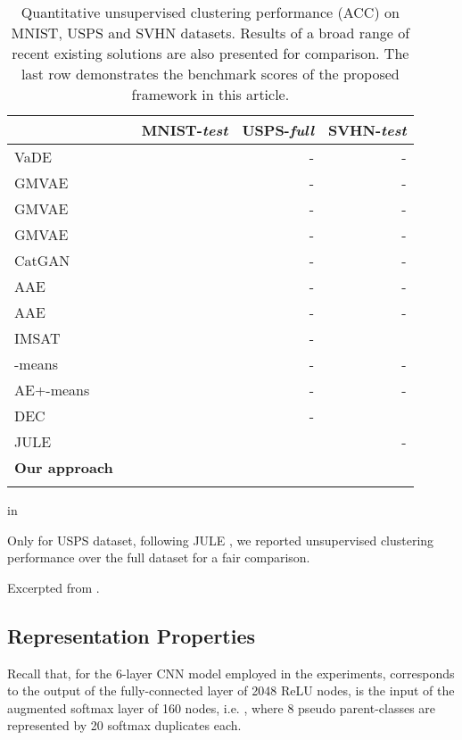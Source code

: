\documentclass{article} \usepackage{iclr2018_conference,times}
\newcommand{\ra}[1]{\renewcommand{\arraystretch}{#1}}
\begin{document}
\begin{table}[h]\centering
\ra{1.2}
\caption{Quantitative unsupervised clustering performance (ACC) on MNIST, USPS and SVHN datasets. Results of a broad range of recent existing solutions are also presented for comparison. The last row demonstrates the benchmark scores of the proposed framework in this article.}
\vskip 0.05in
\begin{tabular}{@{}lrrrr@{}}\toprule
							  	& & MNIST-\textit{test}  	& USPS-\textit{full}	& SVHN-\textit{test}	\\
\midrule
VaDE \citep{JiangZTTZ17}		  	&&  	& -						& -	\\
GMVAE \citep{DilokthanakulMG16}	&& 		& -						& -	\\
GMVAE \citep{DilokthanakulMG16}	&& 		& -						& -	\\
GMVAE \citep{DilokthanakulMG16}	&& 		& -						& -	\\		
\midrule
CatGAN \citep{Springenberg15}  	&&  	& -						& - \\
AAE \citep{MakhzaniSJG15}      	&& 		& -						& - \\
AAE \citep{MakhzaniSJG15}      	&& 		& -						& - \\
IMSAT \citep{HuMTMS17}      	&& 		& -						&  \\
\midrule
-means \citep{XieGF16}	    && 	& -						& - \\
AE+-means \citep{XieGF16}	&& 	& -						& - \\
\midrule
DEC \citep{XieGF16}	          	&& 	& -						&  \\
\midrule
JULE \citep{YangPB16}	      	&& 	& & -	\\
\midrule
\textbf{Our approach} 	      	&& 		& 	& 	\\
\bottomrule
\label{tab:pseudo_all_acc}
\end{tabular}
 in	
\raggedright \tiny  Only for USPS dataset, following JULE \citep{YangPB16}, we reported unsupervised clustering performance over the full dataset for a fair comparison.\\
\raggedright \tiny  Excerpted from \citep{HuMTMS17}.
\end{table}


\subsection{Representation Properties}

Recall that, for the 6-layer CNN model employed in the experiments,  corresponds to the output of the fully-connected layer of 2048 ReLU nodes,  is the input of the augmented softmax layer of 160 nodes, i.e. , where 8 pseudo parent-classes are represented by 20 softmax duplicates each. 
\end{document}
